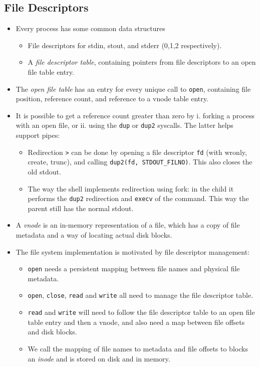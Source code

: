 \documentclass[12pt]{article}
\begin{document}
\subsection{File Descriptors}
\begin{itemize}
	\item Every process has some common data structures
		\begin{itemize}
			\item File descriptors for stdin, stout, and stderr (0,1,2 respectively).
			\item A \textit{file descriptor table}, containing pointers from file descriptors to an open file table entry.
		\end{itemize}
	\item The \textit{open file table} has an entry for every unique call to \texttt{open}, containing file position, reference count, and reference to a vnode table entry. 
		\newpage
	\item It is possible to get a reference count greater than zero by i. forking a process with an open file, or ii. using the \texttt{dup} or \texttt{dup2} syscalls. The latter helps support pipes:
		\begin{itemize}
			\item Redirection \texttt{>} can be done by opening a file descriptor \texttt{fd} (with wronly, create, trunc), and calling \texttt{dup2(fd, STDOUT\_FILNO)}. This also closes the old stdout. 
			\item The way the shell implements redirection using fork: in the child it performs the \texttt{dup2} redirection and \texttt{execv} of the command. This way the parent still has the normal stdout. 
		\end{itemize}
	\item A \textit{vnode} is an in-memory representation of a file, which has a copy of file metadata and a way of locating actual disk blocks. 
	\item The file system implementation is motivated by file descriptor management:
		\begin{itemize}
			\item \texttt{open} needs a persistent mapping between file names and physical file metadata. 
			\item \texttt{open}, \texttt{close}, \texttt{read} and \texttt{write} all need to manage the file descriptor table. 
			\item \texttt{read} and \texttt{write} will need to follow the file descriptor table to an open file table entry and then a vnode, and also need a map between file offsets and disk blocks. 
			\item We call the mapping of file names to metadata and file offsets to blocks an \textit{inode} and is stored on disk and in memory. 
		\end{itemize}
\end{itemize}
\end{document}
